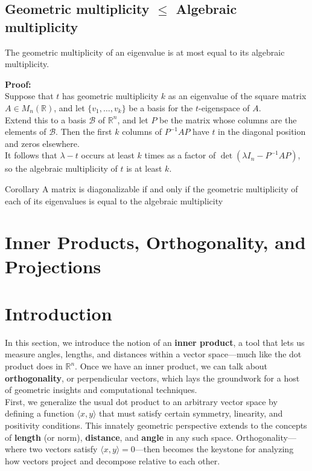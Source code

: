 \documentclass[a4paper, 9pt]{extarticle}
\begin{document}
\subsection{Geometric multiplicity $\leq$ Algebraic multiplicity}
\begin{theorembox}{}{}
  The geometric multiplicity of an eigenvalue is at most equal to its algebraic multiplicity.
\end{theorembox}
\noindent\textbf{Proof:} \\
Suppose that $t$ has geometric multiplicity $k$ as an eigenvalue of the square matrix $A \in M_n(\mathbb{R})$, and let $\{v_1, \dots, v_k\}$ be a basis for the $t$-eigenspace of $A$. \\[2ex]
Extend this to a basis $\mathcal{B}$ of $\mathbb{R}^n$, and let $P$ be the matrix whose columns are the elements of $\mathcal{B}$. Then the first $k$ columns of $P^{-1}AP$ have $t$ in the diagonal position and zeros elsewhere. \\[2ex]
It follows that $\lambda - t$ occurs at least $k$ times as a factor of $\det(\lambda I_n - P^{-1}AP)$, so the algebraic multiplicity of $t$ is at least $k$.
\begin{theorembox}{Corollary}{}
  A matrix is diagonalizable if and only if the geometric multiplicity of each of its eigenvalues is equal to the algebraic multiplicity
\end{theorembox}
\section{Inner Products, Orthogonality, and Projections}
\section*{Introduction}
\noindent In this section, we introduce the notion of an \textbf{inner product}, a tool that lets us measure angles, lengths, and distances within a vector space—much like the dot product does in $\mathbb{R}^n$. Once we have an inner product, we can talk about \textbf{orthogonality}, or perpendicular vectors, which lays the groundwork for a host of geometric insights and computational techniques. \\[2ex]

\noindent First, we generalize the usual dot product to an arbitrary vector space by defining a function $\langle x, y \rangle$ that must satisfy certain symmetry, linearity, and positivity conditions. This innately geometric perspective extends to the concepts of \textbf{length} (or norm), \textbf{distance}, and \textbf{angle} in any such space. Orthogonality—where two vectors satisfy $\langle x, y \rangle = 0$—then becomes the keystone for analyzing how vectors project and decompose relative to each other. \\[2ex]
\end{document}
